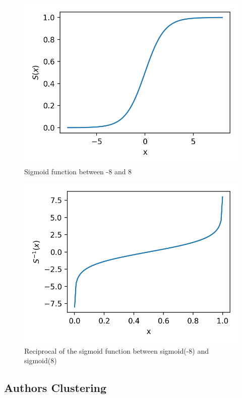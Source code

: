 \begin{figure}
  \includegraphics[width=\linewidth]{img/sigmoid.png}
  \caption{Sigmoid function between -8 and 8}
  \label{fig:sigmoid}
\end{figure}
\begin{figure}
  \includegraphics[width=\linewidth]{img/sigmoid_reciprocal.png}
  \caption{Reciprocal of the sigmoid function between sigmoid(-8) and sigmoid(8)}
  \label{fig:sigmoid_reciprocal}
\end{figure}

\subsection{Authors Clustering}
